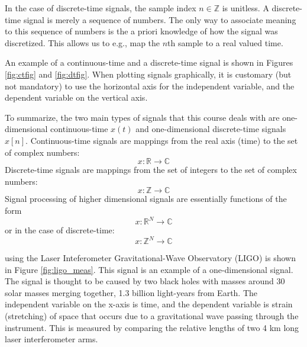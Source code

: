 In the case of discrete-time signals, the sample index
$n \in \mathbb{Z}$ is unitless. A discrete-time signal is merely a
sequence of numbers. The only way to associate meaning to this
sequence of numbers is the a priori knowledge of how the signal was
discretized. This allows us to e.g., map the $n$th sample to a real
valued time.

An example of a continuous-time and a discrete-time signal is shown in
Figures \ref{fig:ctfig} and \ref{fig:dtfig}. When plotting signals
graphically, it is customary (but not mandatory) to use the horizontal
axis for the independent variable, and the dependent variable on the
vertical axis.

To summarize, the two main types of signals that this course deals
with are one-dimensional continuous-time $x(t)$ and one-dimensional
discrete-time signals $x[n]$. Continuous-time signals are mappings
from the real axis (time) to the set of complex numbers:
\begin{equation}
\boxed{
x: \mathbb{R} \rightarrow \mathbb{C}
}
\end{equation}
Discrete-time signals are mappings from the set of integers to the set of complex numbers:
\begin{equation}
\boxed{
x: \mathbb{Z} \rightarrow \mathbb{C}
}
\end{equation}
Signal processing of higher dimensional signals are essentially functions of the form
\begin{equation}
x: \mathbb{R}^N \rightarrow \mathbb{C}
\end{equation}
or in the case of discrete-time:
\begin{equation}
x: \mathbb{Z}^N \rightarrow \mathbb{C}
\end{equation}

using the Laser Inteferometer Gravitational-Wave Observatory (LIGO) is
shown in Figure \ref{fig:ligo_meas}. This signal is an example of a
one-dimensional signal. The signal is thought to be caused by two
black holes with masses around 30 solar masses merging together, 1.3
billion light-years from Earth. The independent variable on the x-axis
is time, and the dependent variable is strain (stretching) of space
that occurs due to a gravitational wave passing through the
instrument. This is measured by comparing the relative lengths of two
4 km long laser interferometer arms. 

